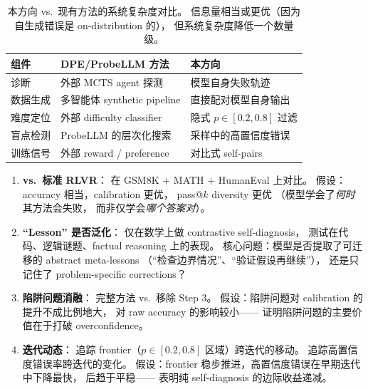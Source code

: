 \documentclass[12pt,a4paper]{article}
\begin{document}
\begin{table}[h]
\centering
\small
\begin{tabular}{lll}
\toprule
\textbf{组件} & \textbf{DPE/ProbeLLM 方法} & \textbf{本方向} \\
\midrule
诊断 & 外部 MCTS agent 探测 & 模型自身失败轨迹 \\
数据生成 & 多智能体 synthetic pipeline & 直接配对模型自身输出 \\
难度定位 & 外部 difficulty classifier & 隐式 $p \in [0.2, 0.8]$ 过滤 \\
盲点检测 & ProbeLLM 的层次化搜索 & 采样中的高置信度错误 \\
训练信号 & 外部 reward / preference & 对比式 self-pairs \\
\bottomrule
\end{tabular}
\caption{本方向 vs.\ 现有方法的系统复杂度对比。
信息量相当或更优（因为自生成错误是 on-distribution 的），
但系统复杂度降低一个数量级。}
\end{table}

\begin{expbox}
\begin{enumerate}[leftmargin=1.5em]
  \item \textbf{vs.\ 标准 RLVR}：
    在 GSM8K $+$ MATH $+$ HumanEval 上对比。
    假设：accuracy 相当，calibration 更优，
    pass@$k$ diversity 更优
    （模型学会了\textit{何时}其方法会失败，
    而非仅学会\textit{哪个答案对}）。

  \item \textbf{``Lesson'' 是否泛化}：
    仅在数学上做 contrastive self-diagnosis，
    测试在代码、逻辑谜题、factual reasoning 上的表现。
    核心问题：模型是否提取了可迁移的 abstract meta-lessons
    （``检查边界情况''、``验证假设再继续''），
    还是只记住了 problem-specific corrections？

  \item \textbf{陷阱问题消融}：
    完整方法 vs.\ 移除 Step 3。
    假设：陷阱问题对 calibration 的提升不成比例地大，
    对 raw accuracy 的影响较小——
    证明陷阱问题的主要价值在于打破 overconfidence。

  \item \textbf{迭代动态}：
    追踪 frontier（$p \in [0.2, 0.8]$ 区域）跨迭代的移动。
    追踪高置信度错误率跨迭代的变化。
    假设：frontier 稳步推进，高置信度错误在早期迭代中下降最快，
    后趋于平稳——
    表明纯 self-diagnosis 的边际收益递减。
\end{enumerate}
\end{expbox}
\end{document}
